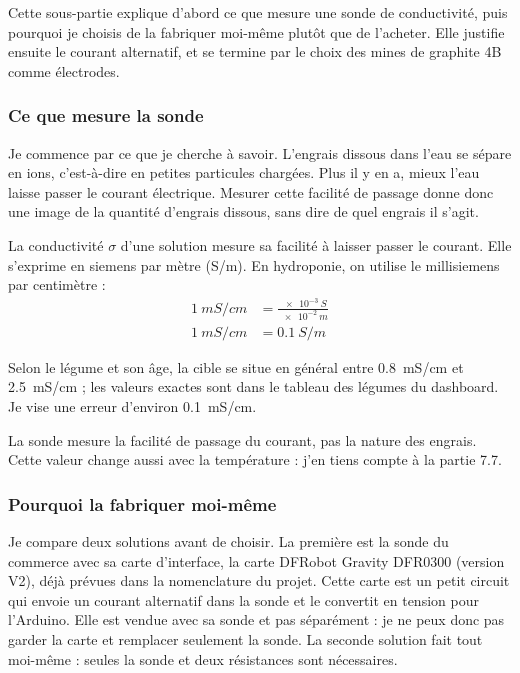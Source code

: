 Cette sous-partie explique d'abord ce que mesure une sonde de conductivité, puis pourquoi je choisis de la fabriquer moi-même plutôt que de l'acheter. Elle justifie ensuite le courant alternatif, et se termine par le choix des mines de graphite 4B comme électrodes.

\subsubsection*{Ce que mesure la sonde}

Je commence par ce que je cherche à savoir. L'engrais dissous dans l'eau se sépare en ions, c'est-à-dire en petites particules chargées. Plus il y en a, mieux l'eau laisse passer le courant électrique. Mesurer cette facilité de passage donne donc une image de la quantité d'engrais dissous, sans dire de quel engrais il s'agit.

\begin{definition}[conductivité]
La conductivité $\sigma$ d'une solution mesure sa facilité à laisser passer le courant. Elle s'exprime en siemens par mètre (\unit{S/m}). En hydroponie, on utilise le millisiemens par centimètre :
\begin{align*}
\qty{1}{mS/cm} &= \frac{\qty{e-3}{S}}{\qty{e-2}{m}}\\
\qty{1}{mS/cm} &= \qty{0,1}{S/m}
\end{align*}
\end{definition}

Selon le légume et son âge, la cible se situe en général entre \qty{0,8}{mS/cm} et \qty{2,5}{mS/cm} ; les valeurs exactes sont dans le tableau des légumes du dashboard. Je vise une erreur d'environ \qty{0,1}{mS/cm}.

\begin{aretenir}
La sonde mesure la facilité de passage du courant, pas la nature des engrais. Cette valeur change aussi avec la température : j'en tiens compte à la partie 7.7.
\end{aretenir}

\subsubsection*{Pourquoi la fabriquer moi-même}

Je compare deux solutions avant de choisir. La première est la sonde du commerce avec sa carte d'interface, la carte DFRobot Gravity DFR0300 (version V2), déjà prévues dans la nomenclature du projet. Cette carte est un petit circuit qui envoie un courant alternatif dans la sonde et le convertit en tension pour l'Arduino. Elle est vendue avec sa sonde et pas séparément : je ne peux donc pas garder la carte et remplacer seulement la sonde. La seconde solution fait tout moi-même : seules la sonde et deux résistances sont nécessaires.

